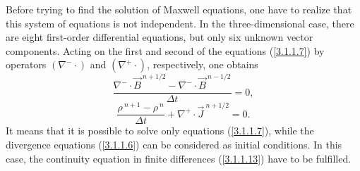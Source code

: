 Before trying to find the solution of Maxwell equations, one have to realize that this system of equations is not independent. In the three-dimensional case, there are eight first-order differential equations, but only six unknown vector components. Acting on the first and second of the equations (\ref{3.1.1.7}) by operators $ \left(\nabla^{-}\cdot\right) $ and $ \left(\nabla^{+}\cdot\right) $, respectively, one obtains
\begin{equation}
\label{3.1.1.12}
\frac{\nabla^{-} \cdot \vec{B}^{\:n + 1/2} - \nabla^{-} \cdot \vec{B}^{\:n - 1/2}}{\Delta t} = 0,
\end{equation}
\begin{equation}
\label{3.1.1.13}
\frac{\rho^{\:n + 1} - \rho^{\:n}}{\Delta t} + \nabla^{+} \cdot \vec{J}^{\:n + 1/2} = 0.
\end{equation}
It means that it is possible to solve only equations (\ref{3.1.1.7}), while the divergence equations (\ref{3.1.1.6}) can be considered as initial conditions. In this case, the continuity equation in finite differences (\ref{3.1.1.13}) have to be fulfilled.